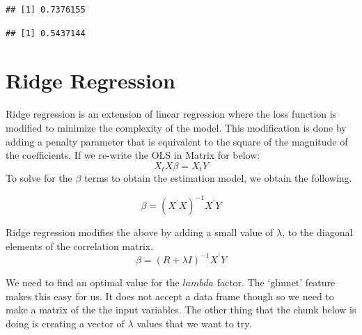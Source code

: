 \documentclass[
]{book}
\newenvironment{Shaded}{\begin{snugshade}}{\end{snugshade}}
\newcommand{\AttributeTok}[1]{\textcolor[rgb]{0.77,0.63,0.00}{#1}}
\newcommand{\FloatTok}[1]{\textcolor[rgb]{0.00,0.00,0.81}{#1}}
\newcommand{\FunctionTok}[1]{\textcolor[rgb]{0.00,0.00,0.00}{#1}}
\newcommand{\NormalTok}[1]{#1}
\newcommand{\OtherTok}[1]{\textcolor[rgb]{0.56,0.35,0.01}{#1}}
\newcommand{\SpecialCharTok}[1]{\textcolor[rgb]{0.00,0.00,0.00}{#1}}
\begin{document}
\begin{Shaded}
\end{Shaded}

\begin{verbatim}
## [1] 0.7376155
\end{verbatim}

\begin{Shaded}
\end{Shaded}

\begin{verbatim}
## [1] 0.5437144
\end{verbatim}

\hypertarget{ridge-regression}{%
\section{Ridge Regression}\label{ridge-regression}}

Ridge regression is an extension of linear regression where the loss function is modified to minimize the complexity of the model. This modification is done by adding a penalty parameter that is equivalent to the square of the magnitude of the coefficients. If we re-write the OLS in Matrix for below:
\[X_tX\beta = X_tY\]
To solve for the \(\beta\) terms to obtain the estimation model, we obtain the following.

\[\beta = (X^{'}X)^{-1}X^{'}Y\]

Ridge regression modifies the above by adding a small value of \(\lambda\), to the diagonal elements of the correlation matrix.
\[\beta = (R+\lambda I)^{-1}X^{'}Y\]

We need to find an optimal value for the \(lambda\) factor. The `glmnet' feature makes this easy for us. It does not accept a data frame though so we need to make a matrix of the the input variables. The other thing that the chunk below is doing is creating a vector of \(\lambda\) values that we want to try.
\end{document}

